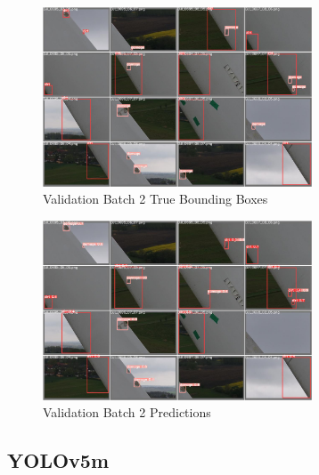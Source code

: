 \documentclass[conference]{IEEEtran}
\begin{document}
\begin{figure}[H]
    \centering
    \includegraphics[width=8cm]{Images/YOLOv5L/val_batch2_labels.jpg}
    \caption{Validation Batch 2 True Bounding Boxes}
\end{figure}
\begin{figure}[H]
    \centering
    \includegraphics[width=8cm]{Images/YOLOv5L/val_batch2_pred.jpg}
    \caption{Validation Batch 2 Predictions}
\end{figure}
\cleardoublepage
\subsection{YOLOv5m}
\end{document}
